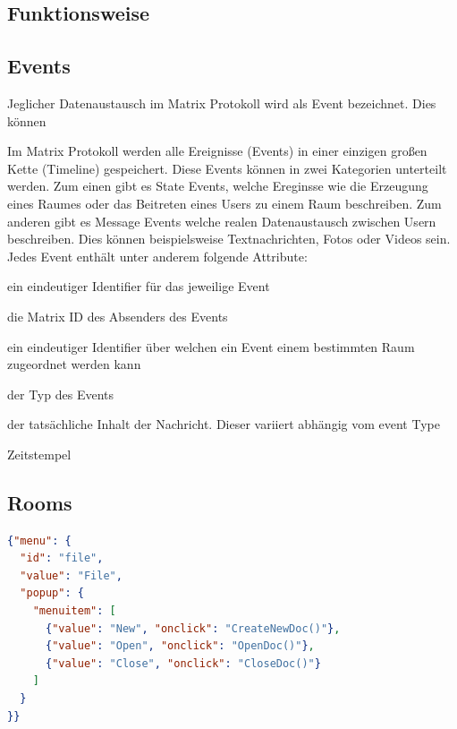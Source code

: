     \subsection{Funktionsweise}\label{subsec:funktionsweise}
%
%    

    \subsection{Events}\label{sec:events}
    Jeglicher Datenaustausch im Matrix Protokoll wird als Event bezeichnet.
    Dies können


    Im Matrix Protokoll werden alle Ereignisse (Events) in einer einzigen großen Kette (Timeline) gespeichert. Diese Events können in zwei Kategorien unterteilt werden. Zum einen gibt es State Events, welche Ereginsse wie die Erzeugung eines Raumes oder das Beitreten eines Users zu einem Raum beschreiben.
    Zum anderen gibt es Message Events welche realen Datenaustausch zwischen Usern beschreiben. Dies können beispielsweise Textnachrichten, Fotos oder Videos sein. Jedes Event enthält unter anderem folgende Attribute:
    \begin{description}[leftmargin=!,labelwidth=3.5cm]
        \item [event\_id] ein eindeutiger Identifier für das jeweilige Event
        \item [sender] die Matrix ID des Absenders des Events
        \item [room\_id] ein eindeutiger Identifier über welchen ein Event einem bestimmten Raum zugeordnet werden kann
        \item [type] der Typ des Events
        \item [content] der tatsächliche Inhalt der Nachricht. Dieser variiert abhängig vom event Type
        \item [origin\_server\_ts] Zeitstempel
    \end{description}

    \subsection{Rooms}


    \begin{lstlisting}[language=json,firstnumber=1]
{"menu": {
  "id": "file",
  "value": "File",
  "popup": {
    "menuitem": [
      {"value": "New", "onclick": "CreateNewDoc()"},
      {"value": "Open", "onclick": "OpenDoc()"},
      {"value": "Close", "onclick": "CloseDoc()"}
    ]
  }
}}
    \end{lstlisting}


